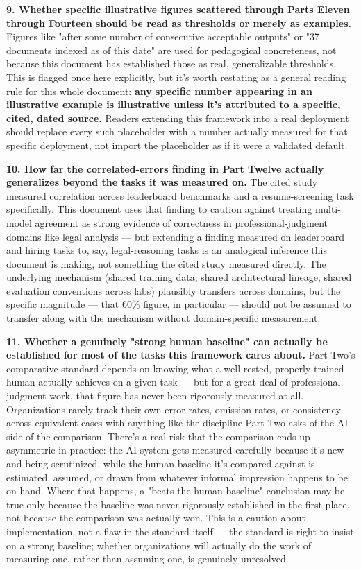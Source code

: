 \textbf{9. Whether specific illustrative figures scattered through Parts Eleven through Fourteen should be read as thresholds or merely as examples.} Figures like "after some number of consecutive acceptable outputs" or "37 documents indexed as of this date" are used for pedagogical concreteness, not because this document has established those as real, generalizable thresholds. This is flagged once here explicitly, but it's worth restating as a general reading rule for this whole document: \textbf{any specific number appearing in an illustrative example is illustrative unless it's attributed to a specific, cited, dated source.} Readers extending this framework into a real deployment should replace every such placeholder with a number actually measured for that specific deployment, not import the placeholder as if it were a validated default.

\textbf{10. How far the correlated-errors finding in Part Twelve actually generalizes beyond the tasks it was measured on.} The cited study measured correlation across leaderboard benchmarks and a resume-screening task specifically. This document uses that finding to caution against treating multi-model agreement as strong evidence of correctness in professional-judgment domains like legal analysis --- but extending a finding measured on leaderboard and hiring tasks to, say, legal-reasoning tasks is an analogical inference this document is making, not something the cited study measured directly. The underlying mechanism (shared training data, shared architectural lineage, shared evaluation conventions across labs) plausibly transfers across domains, but the specific magnitude --- that 60\% figure, in particular --- should not be assumed to transfer along with the mechanism without domain-specific measurement.

\textbf{11. Whether a genuinely "strong human baseline" can actually be established for most of the tasks this framework cares about.} Part Two's comparative standard depends on knowing what a well-rested, properly trained human actually achieves on a given task --- but for a great deal of professional-judgment work, that figure has never been rigorously measured at all. Organizations rarely track their own error rates, omission rates, or consistency-across-equivalent-cases with anything like the discipline Part Two asks of the AI side of the comparison. There's a real risk that the comparison ends up asymmetric in practice: the AI system gets measured carefully because it's new and being scrutinized, while the human baseline it's compared against is estimated, assumed, or drawn from whatever informal impression happens to be on hand. Where that happens, a "beats the human baseline" conclusion may be true only because the baseline was never rigorously established in the first place, not because the comparison was actually won. This is a caution about implementation, not a flaw in the standard itself --- the standard is right to insist on a strong baseline; whether organizations will actually do the work of measuring one, rather than assuming one, is genuinely unresolved.

